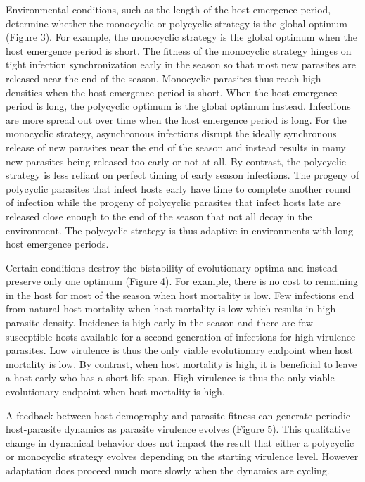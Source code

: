 \documentclass{article}
\begin{document}
Environmental conditions, such as the length of the host emergence period, determine whether the monocyclic or polycyclic strategy is the global optimum (Figure 3). For example, the monocyclic strategy is the global optimum when the host emergence period is short. The fitness of the monocyclic strategy hinges on tight infection synchronization early in the season so that most new parasites are released near the end of the season. Monocyclic parasites thus reach high densities when the host emergence period is short. When the host emergence period is long, the polycyclic optimum is the global optimum instead. Infections are more spread out over time when the host emergence period is long. For the monocyclic strategy, asynchronous infections disrupt the ideally synchronous release of new parasites near the end of the season and instead results in many new parasites being released too early or not at all. By contrast, the polycyclic strategy is less reliant on perfect timing of early season infections. The progeny of polycyclic parasites that infect hosts early have time to complete another round of infection while the progeny of polycyclic parasites that infect hosts late are released close enough to the end of the season that not all decay in the environment. The polycyclic strategy is thus adaptive in environments with long host emergence periods.

Certain conditions destroy the bistability of evolutionary optima and instead preserve only one optimum (Figure 4). For example, there is no cost to remaining in the host for most of the season when host mortality is low. Few infections end from natural host mortality when host mortality is low which results in high parasite density. Incidence is high early in the season and there are few susceptible hosts available for a second generation of infections for high virulence parasites. Low virulence is thus the only viable evolutionary endpoint when host mortality is low. By contrast, when host mortality is high, it is beneficial to leave a host early who has a short life span. High virulence is thus the only viable evolutionary endpoint when host mortality is high.

A feedback between host demography and parasite fitness can generate periodic host-parasite dynamics as parasite virulence evolves (Figure 5). This qualitative change in dynamical behavior does not impact the result that either a polycyclic or monocyclic strategy evolves depending on the starting virulence level. However adaptation does proceed much more slowly when the dynamics are cycling.
\end{document}
